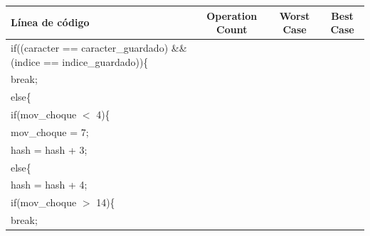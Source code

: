 \documentclass[letterpaper]{article}
\begin{document}
{\raggedright

\vspace{3pt} \noindent
\begin{tabular}{|l|c|c|c|}
\hline
Línea de código & Operation Count & Worst Case & Best Case \\

\hline
\parbox{297pt}{\raggedright 
\hspace{2.5cm} if((caracter == caracter\_guardado) \&\& (indice == indice\_guardado))\{
} & \parbox{45pt}{} & \parbox{24pt}{} & \parbox{17pt}{} \\
\hline
\parbox{297pt}{\raggedright 
\hspace{3cm} break;
} & \parbox{45pt}{} & \parbox{24pt}{} & \parbox{17pt}{} \\

\hline
\parbox{297pt}{\raggedright 
\hspace{2.5cm} else\{
} & \parbox{45pt}{} & \parbox{24pt}{} & \parbox{17pt}{} \\
\hline
\parbox{297pt}{\raggedright 
\hspace{3cm} if(mov\_choque $<$ 4)\{
} & \parbox{45pt}{} & \parbox{24pt}{} & \parbox{17pt}{} \\
\hline
\parbox{297pt}{\raggedright 
\hspace{3.5cm} mov\_choque = 7;
} & \parbox{45pt}{} & \parbox{24pt}{} & \parbox{17pt}{} \\
\hline
\parbox{297pt}{\raggedright 
\hspace{3.5cm} hash = hash + 3;
} & \parbox{45pt}{} & \parbox{24pt}{} & \parbox{17pt}{} \\

\hline
\parbox{297pt}{\raggedright 
\hspace{3cm} else\{
} & \parbox{45pt}{} & \parbox{24pt}{} & \parbox{17pt}{} \\
\hline
\parbox{297pt}{\raggedright 
\hspace{3.5cm} hash = hash + 4;
} & \parbox{45pt}{} & \parbox{24pt}{} & \parbox{17pt}{} \\
\hline
\parbox{297pt}{\raggedright 
\hspace{3.5cm} if(mov\_choque $>$ 14)\{
} & \parbox{45pt}{} & \parbox{24pt}{} & \parbox{17pt}{} \\
\hline
\parbox{297pt}{\raggedright 
\hspace{4cm} break;
} & \parbox{45pt}{} & \parbox{24pt}{} & \parbox{17pt}{} \\



\end{tabular}}
\end{document}
